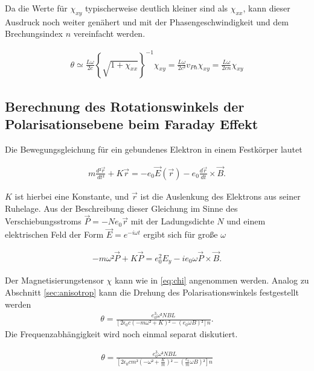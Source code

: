 Da die Werte für $\chi_{xy}$ typischerweise deutlich kleiner sind als
$\chi_{xx}$, kann dieser Ausdruck noch weiter genähert und mit der
Phasengeschwindigkeit und dem Brechungsindex $n$ vereinfacht werden.

\begin{align}
	\theta \simeq \frac{L \omega}{2c}\left\{ \sqrt{1+\chi_{xx}}\right\}^{-1} \chi_{xy} =\frac{L \omega}{2c²} v_{Ph} \chi_{xy} = \frac{L \omega}{2c n} \chi_{xy}
\end{align}

\subsection{Berechnung des Rotationswinkels der Polarisationsebene beim Faraday Effekt \cite{man_a} }
Die Bewegungsgleichung für ein gebundenes Elektron in einem Festkörper lautet

\begin{align}
	m \frac{d² \vec{r}}{d t²} + K \vec{r} = -e_0 \vec{E}(\vec{r})- e_0 \frac{d \vec{r}}{dt} \times \vec{B}.
\end{align}

$K$ ist hierbei eine Konstante, und $\vec{r}$ ist die Auslenkung des Elektrons aus seiner Ruhelage.
Aus der Beschreibung dieser Gleichung im Sinne des Verschiebungsstroms $\vec{P} = -N e_0 \vec{r}$
mit der Ladungsdichte $N$
und einem elektrischen Feld der Form $\vec{E} = e^{- i \omega t}$ ergibt sich für große $\omega$

\begin{align}
	-m\omega² \vec{P} + K \vec{P} = e_0^2 E_y -i e_0 \omega \vec{P} \times \vec{B}.
\end{align}

Der Magnetisierungstensor $\chi$ kann wie in \eqref{eq:chi} angenommen werden.
Analog zu Abschnitt \ref{sec:anisotrop} kann die Drehung des
Polarisationswinkels festgestellt werden
\begin{align}
	\theta = \frac{e_0^3 \omega² NBL}{[2 \epsilon_0 c(-m\omega²+ K)² -(e_0 \omega B)²]n}.
\end{align}
Die Frequenzabhängigkeit wird noch einmal separat diskutiert.

\begin{align}
	\theta = \frac{e_0^3 \omega² NBL}{[2 \epsilon_0 c m²(-\omega²+ \frac{K}{m})² -(\frac{e_0}{m}\omega B)²]n}
\end{align}

